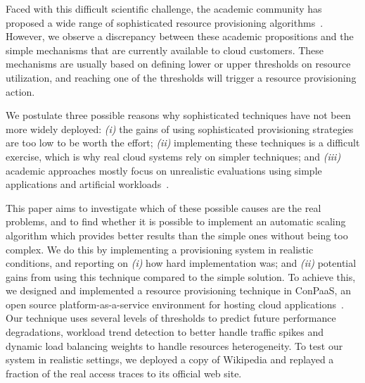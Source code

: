 Faced with this difficult scientific challenge, the academic community
has proposed a wide range of sophisticated resource provisioning
algorithms~\cite{xxx,yyy,zzz}. 
However, we observe a discrepancy between these academic propositions
and the simple mechanisms that are currently available to  
cloud customers. These mechanisms are usually based on defining 
lower or upper thresholds on resource utilization, and reaching one of the
thresholds will trigger a resource provisioning action. 

We postulate three possible reasons why sophisticated
techniques have not been more widely deployed: \emph{(i)} the gains of
using sophisticated provisioning strategies are too low to be worth
the effort; \emph{(ii)} implementing these techniques is a difficult
exercise, which is why real cloud systems rely on simpler techniques;
and \emph{(iii)} academic approaches mostly focus on unrealistic
evaluations using simple applications and artificial
workloads~\cite{do_profiling_2011, islam_empirical_2012,
wang_appraise:_2009}. %

This paper aims to investigate which of these possible causes 
are the real problems, and to find whether it is possible to
implement an automatic scaling algorithm which provides better 
results than the simple ones without being too complex.
We do this by implementing a provisioning system in realistic 
conditions, and reporting on \emph{(i)} how hard implementation 
was; and \emph{(ii)} potential gains from using this  technique 
compared to the simple solution. To achieve this, we designed 
and implemented a resource provisioning technique in ConPaaS, 
an open source platform-as-a-service environment for hosting 
cloud applications~\cite{conpaasIC}. Our technique uses several
levels of thresholds to predict future performance degradations, 
workload trend detection to better handle traffic spikes
and dynamic load balancing weights to handle resources heterogeneity. 
To test our system in realistic settings, we deployed a copy of 
Wikipedia and replayed a fraction of the real access traces to
its official web site.


